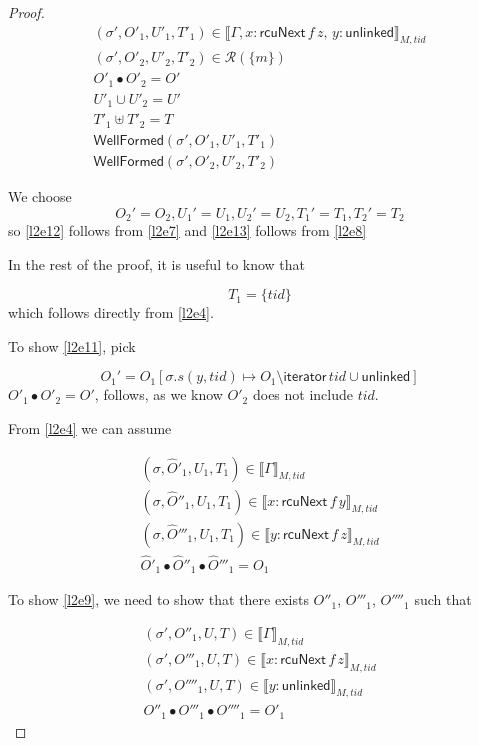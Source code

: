 \begin{proof}
\begin{gather}\label{l2e9}
(\sigma',O'_{1},U'_{1}, T'_{1}) \in \llbracket \Gamma,x:\mathsf{rcuNext}\,f \, z , \, y :\mathsf{unlinked}  \rrbracket_{M,tid}
\\
\label{l2e10}
(\sigma',O'_{2},U'_{2}, T'_{2}) \in \mathcal{R}(\{m\})
\\
 \label{l2e11}
O'_{1} \bullet O'_{2} = O'
\\
 \label{l2e12}
U'_{1} \cup U'_{2} = U' 
\\
 \label{l2e13}
T'_{1} \uplus T'_{2} = T
\\
\label{l2wfp1}
\textsf{WellFormed}(\sigma',O'_{1},U'_{1},T'_{1})
\\
\label{l2wfp2}
\textsf{WellFormed}(\sigma',O'_{2},U'_{2},T'_{2})
\end{gather}

We choose \[O_{2}' = O_{2}, U_{1}' = U_{1}, U_{2}' = U_{2}, T_{1}' = T_{1}, T_{2}' = T_{2}\]  so \ref{l2e12} follows from \ref{l2e7} and \ref{l2e13} follows from \ref{l2e8}

In the rest of the proof, it is useful to know that 

\begin{equation} \label{l2e14}
T_{1} = \{tid\}
\end{equation}
which follows directly from \ref{l2e4}.


To show \ref{l2e11}, pick

\[O_{1}' = O_{1}[\sigma.s(y,tid) \mapsto O_{1} \setminus \textsf{iterator} \, tid \cup \textsf{unlinked}]\]
$O'_{1} \bullet O'_{2} = O'$, follows, as we know $O'_{2}$ does not include $tid$.


From \ref{l2e4} we can assume


\begin{gather} \label{l2e14}
(\sigma,\hat{O}'_{1},U_{1},T_{1})  \in \llbracket \Gamma \rrbracket_{M,tid}
\\
 \label{l2e15}
(\sigma,\hat{O}''_{1},U_{1},T_{1})  \in \llbracket x:\mathsf{rcuNext} \, f \, y \rrbracket_{M,tid}
\\
\label{l2e16}
(\sigma,\hat{O}'''_{1},U_{1},T_{1}) \in \llbracket y:\mathsf{rcuNext} \, f \, z \rrbracket_{M,tid}
\\
 \label{l2e17}
\hat{O}'_{1} \bullet \hat{O}''_{1} \bullet \hat{O}'''_{1} = O_{1}
\end{gather}


To show \ref{l2e9}, we need to show that there exists  $O''_{1}$, $O'''_{1}$, $O''''_{1}$ such that 

\begin{gather} \label{l2e18}
(\sigma', O''_{1},U ,T) \in \llbracket \Gamma \rrbracket_{M,tid}
\\
 \label{l2e19}
(\sigma', O'''_{1},U ,T) \in \llbracket x:\mathsf{rcuNext} \, f \, z \rrbracket_{M,tid}
\\
 \label{l2e20}
(\sigma', O''''_{1},U ,T) \in \llbracket y:\mathsf{unlinked} \rrbracket_{M,tid}
\\ 
\label{l2e21}
O''_{1} \bullet O'''_{1} \bullet O''''_{1} = O'_{1}
\end{gather}


\end{proof}
